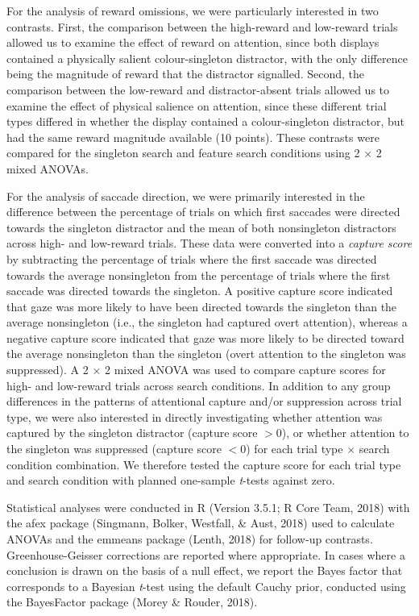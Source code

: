 \documentclass[jou, a4paper, noextraspace,floatsintext]{apa6}
\theoremstyle{definition}
\theoremstyle{definition}
\theoremstyle{definition}
\theoremstyle{remark}
\begin{document}
For the analysis of reward omissions, we were particularly interested in
two contrasts. First, the comparison between the high-reward and
low-reward trials allowed us to examine the effect of reward on
attention, since both displays contained a physically salient
colour-singleton distractor, with the only difference being the
magnitude of reward that the distractor signalled. Second, the
comparison between the low-reward and distractor-absent trials allowed
us to examine the effect of physical salience on attention, since these
different trial types differed in whether the display contained a
colour-singleton distractor, but had the same reward magnitude available
(10 points). These contrasts were compared for the singleton search and
feature search conditions using 2 \(\times\) 2 mixed ANOVAs.

For the analysis of saccade direction, we were primarily interested in
the difference between the percentage of trials on which first saccades
were directed towards the singleton distractor and the mean of both
nonsingleton distractors across high- and low-reward trials. These data
were converted into a \emph{capture score} by subtracting the percentage
of trials where the first saccade was directed towards the average
nonsingleton from the percentage of trials where the first saccade was
directed towards the singleton. A positive capture score indicated that
gaze was more likely to have been directed towards the singleton than
the average nonsingleton (i.e., the singleton had captured overt
attention), whereas a negative capture score indicated that gaze was
more likely to be directed toward the average nonsingleton than the
singleton (overt attention to the singleton was suppressed). A 2
\(\times\) 2 mixed ANOVA was used to compare capture scores for high-
and low-reward trials across search conditions. In addition to any group
differences in the patterns of attentional capture and/or suppression
across trial type, we were also interested in directly investigating
whether attention was captured by the singleton distractor (capture
score \(>0\)), or whether attention to the singleton was suppressed
(capture score \(<0\)) for each trial type \(\times\) search condition
combination. We therefore tested the capture score for each trial type
and search condition with planned one-sample \emph{t}-tests against
zero.

Statistical analyses were conducted in R (Version 3.5.1; R Core Team,
2018) with the afex package (Singmann, Bolker, Westfall, \& Aust, 2018)
used to calculate ANOVAs and the emmeans package (Lenth, 2018) for
follow-up contrasts. Greenhouse-Geisser corrections are reported where
appropriate. In cases where a conclusion is drawn on the basis of a null
effect, we report the Bayes factor that corresponds to a Bayesian
\emph{t}-test using the default Cauchy prior, conducted using the
BayesFactor package (Morey \& Rouder, 2018).
\end{document}
